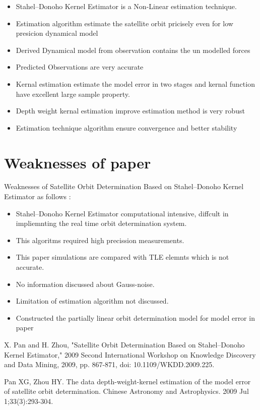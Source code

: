\documentclass[conference]{IEEEtran}
\begin{document}
\begin{itemize}
\item Stahel–Donoho Kernel Estimator is a Non-Linear estimation technique.
\item Estimation algorithm estimate the satellite orbit pricisely even for low presicion dynamical model
\item Derived Dynamical model from observation contains the un modelled forces 
\item Predicted Observations are very accurate 
\item Kernal estimation estimate the model error in two stages and kernal function have excellent large sample property.
\item Depth weight kernal estimation improve estimation method is very robust \cite{b2}
\item Estimation technique algorithm ensure convergence and better stability
           
 
\end{itemize}

\section{Weaknesses of paper \cite{b1}}
Weaknesses of Satellite Orbit Determination Based on Stahel–Donoho Kernel Estimator as follows :
\begin{itemize}
\item Stahel–Donoho Kernel Estimator computational intensive, diffcult in impliemnting the real time orbit determination system.
\item This algoritms required high precission measurements.
\item This paper \cite{b1} simulations are compared with TLE elemnts which is not accurate. 
\item No information discussed about Gauss-noise.
\item Limitation of estimation algorithm not discussed. 
\item Constructed the partially linear orbit determination model for model error in paper \cite{b1}  
\end{itemize}


\begin{thebibliography}{00}
	
 X. Pan and H. Zhou, "Satellite Orbit Determination Based on Stahel–Donoho Kernel Estimator," 2009 Second International Workshop on Knowledge Discovery and Data Mining, 2009, pp. 867-871, doi: 10.1109/WKDD.2009.225.

 Pan XG, Zhou HY. The data depth-weight-kernel estimation of the model error of satellite orbit determination. Chinese Astronomy and Astrophysics. 2009 Jul 1;33(3):293-304.

\end{thebibliography}
\end{document}
